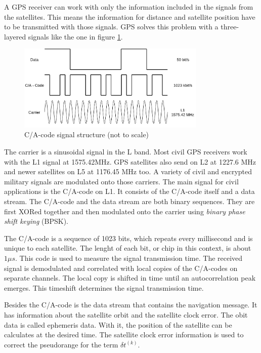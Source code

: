 A GPS receiver can work with only the information included in the signals from the satellites.
This means the information for distance and satellite position have to be transmitted with those signals.
GPS solves this problem with a three-layered signals like the one in figure \ref{fig:signal_structure}.

\begin{figure}[ht]
 \centering
 \includegraphics[width=0.8\textwidth]{images/Signal_Structure.png}
 \caption{C/A-code signal structure (not to scale)}
 \label{fig:signal_structure}
\end{figure}

The carrier is a sinusoidal signal in the L band.
Most civil GPS receivers work with the L1 signal at 1575.42MHz.
GPS satellites also send on L2 at 1227.6 MHz and newer satellites on L5 at 1176.45 MHz too.
A variety of civil and encrypted military signals are modulated onto those carriers.
The main signal for civil applications is the C/A-code on L1.
It consists of the C/A-code itself and a data stream.
The C/A-code and the data stream are both binary sequences.
They are first XORed together and then modulated onto the carrier using \textit{binary phase shift keying} (BPSK).

The C/A-code is a sequence of 1023 bits, which repeats every millisecond and is unique to each satellite.
The lenght of each bit, or chip in this context, is about $1\mu s$.
This code is used to measure the signal transmission time.
The received signal is demodulated and correlated with local copies of the C/A-codes on separate channels.
The local copy is shifted in time until an autocorrelation peak emerges.
This timeshift determines the signal transmission time. 

Besides the C/A-code is the data stream that contains the navigation message.
It has information about the satellite orbit and the satellite clock error.
The obit data is called ephemeris data.
With it, the position of the satellite can be calculates at the desired time.
The satellite clock error information is used to correct the pseudorange for the term $\delta t^{(k)}$.

